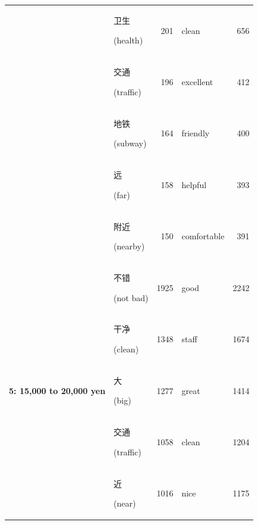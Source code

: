 \documentclass[smallextended,natbib]{svjour3}       %
\begin{document}
\begin{table}[ht]
{\begin{tabular}{|c|lr|lr|}
                                                             & \begin{CJK}{UTF8}{gbsn}卫生\end{CJK} (health)          & 201   & clean       & 656   \\  
                                                             & \begin{CJK}{UTF8}{gbsn}交通\end{CJK} (traffic)         & 196   & excellent   & 412   \\  
                                                             & \begin{CJK}{UTF8}{gbsn}地铁\end{CJK} (subway)          & 164   & friendly    & 400   \\  
                                                             & \begin{CJK}{UTF8}{gbsn}远\end{CJK} (far)              & 158   & helpful     & 393   \\  
                                                             & \begin{CJK}{UTF8}{gbsn}附近\end{CJK} (nearby)          & 150   & comfortable & 391   \\ \hline
        \multirow{10}{*}{\textbf{5: 15,000 to 20,000 yen}}   & \begin{CJK}{UTF8}{gbsn}不错\end{CJK} (not bad)         & 1925  & good        & 2242  \\  
                                                             & \begin{CJK}{UTF8}{gbsn}干净\end{CJK} (clean)           & 1348  & staff       & 1674  \\  
                                                             & \begin{CJK}{UTF8}{gbsn}大\end{CJK} (big)              & 1277  & great       & 1414  \\  
                                                             & \begin{CJK}{UTF8}{gbsn}交通\end{CJK} (traffic)         & 1058  & clean       & 1204  \\  
                                                             & \begin{CJK}{UTF8}{gbsn}近\end{CJK} (near)             & 1016  & nice        & 1175  \\  

\end{tabular}}
\end{table}
\end{document}
